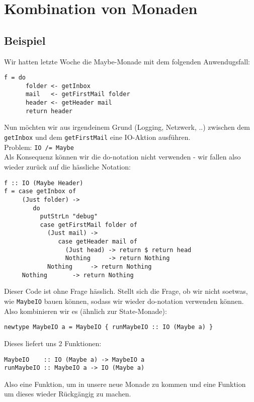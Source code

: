 \documentclass{beamer}
\begin{document}
\section{Kombination von Monaden}

\subsection{Beispiel}
\begin{frame}[fragile]
Wir hatten letzte Woche die Maybe-Monade mit dem folgenden Anwendugsfall:
\begin{verbatim}
f = do
      folder <- getInbox
      mail   <- getFirstMail folder
      header <- getHeader mail
      return header
\end{verbatim}
\pause
Nun möchten wir aus irgendeinem Grund (Logging, Netzwerk, ..) zwischen dem \texttt{getInbox} und dem \texttt{getFirstMail} eine IO-Aktion ausführen.\\
\bigskip \pause
Problem: \texttt{IO /= Maybe}\\
\pause
Als Konsequenz können wir die do-notation nicht verwenden - wir fallen also wieder zurück auf die hässliche Notation:
\end{frame}

\begin{frame}[fragile]
\begin{verbatim}
f :: IO (Maybe Header)
f = case getInbox of
     (Just folder) -> 
        do
          putStrLn "debug"
          case getFirstMail folder of
            (Just mail) -> 
               case getHeader mail of
                 (Just head) -> return $ return head
                 Nothing     -> return Nothing
            Nothing     -> return Nothing
     Nothing       -> return Nothing
\end{verbatim}
\end{frame}

\begin{frame}[fragile]
Dieser Code ist ohne Frage hässlich. Stellt sich die Frage, ob wir nicht soetwas, wie \texttt{MaybeIO} bauen können, sodass wir wieder do-notation verwenden können.\\
\pause
Also kombinieren wir es (ähnlich zur State-Monade):
\begin{verbatim}
newtype MaybeIO a = MaybeIO { runMaybeIO :: IO (Maybe a) }
\end{verbatim}
\pause
Dieses liefert uns 2 Funktionen:
\begin{verbatim}
MaybeIO    :: IO (Maybe a) -> MaybeIO a
runMaybeIO :: MaybeIO a -> IO (Maybe a)
\end{verbatim}
Also eine Funktion, um in unsere neue Monade zu kommen und eine Funktion um dieses wieder Rückgängig zu machen.
\end{frame}
\end{document}
